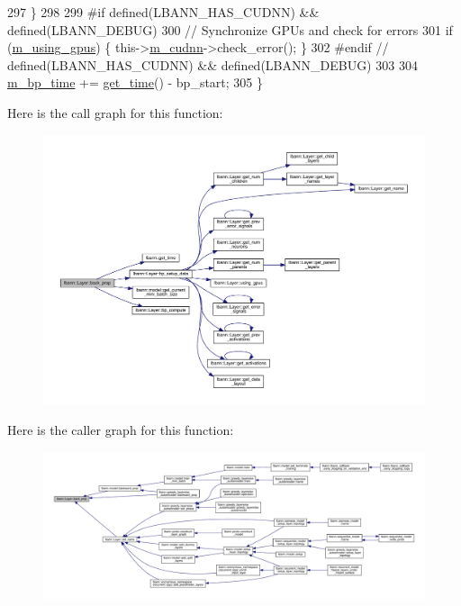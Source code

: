 \begin{DoxyCode}
297   \}
298 
299 \textcolor{preprocessor}{  #if defined(LBANN\_HAS\_CUDNN) && defined(LBANN\_DEBUG)}
300   \textcolor{comment}{// Synchronize GPUs and check for errors}
301   \textcolor{keywordflow}{if} (\hyperlink{classlbann_1_1Layer_af7881cb5eff5207c15fa835d65462e8f}{m\_using\_gpus}) \{ this->\hyperlink{classlbann_1_1Layer_a08dbb94239e3b8c96329786c57c72e21}{m\_cudnn}->check\_error(); \}
302 \textcolor{preprocessor}{  #endif // defined(LBANN\_HAS\_CUDNN) && defined(LBANN\_DEBUG)}
303 
304   \hyperlink{classlbann_1_1Layer_aa60fc41627bcaa9c345775bf5737bb45}{m\_bp\_time} += \hyperlink{namespacelbann_a478d36031ff0659893c4322cd856157f}{get\_time}() - bp\_start;
305 \}
\end{DoxyCode}
Here is the call graph for this function\+:\nopagebreak
\begin{figure}[H]
\begin{center}
\leavevmode
\includegraphics[width=350pt]{classlbann_1_1Layer_a0a502d9218d7dbbfd10ebebb6f917033_cgraph}
\end{center}
\end{figure}
Here is the caller graph for this function\+:\nopagebreak
\begin{figure}[H]
\begin{center}
\leavevmode
\includegraphics[width=350pt]{classlbann_1_1Layer_a0a502d9218d7dbbfd10ebebb6f917033_icgraph}
\end{center}
\end{figure}
\mbox{\label{classlbann_1_1Layer_a7442e01f9ee1294df2de811efcf5171e}} 

